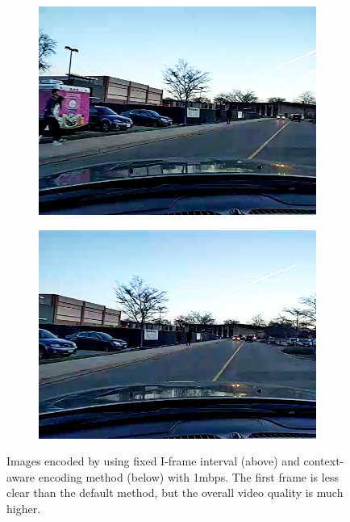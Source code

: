 \begin{figure}[!t]
\begin{subfigure}[t]{0.25\textwidth}
    \includegraphics[width=\linewidth]{Figs/RTDrive/evaluation/frames/context_2.png}
  \end{subfigure}%
  \begin{subfigure}[t]{0.25\textwidth}
    \includegraphics[width=\linewidth]{Figs/RTDrive/evaluation/frames/context_3.png}
  \end{subfigure}%
  \caption{Images encoded by using fixed I-frame interval (above) and 
          context-aware encoding method (below) with 1mbps.
         The first frame is less clear than the default method, but the overall
         video quality is much higher. }
  \label{context_encoding_images}
\end{figure}


